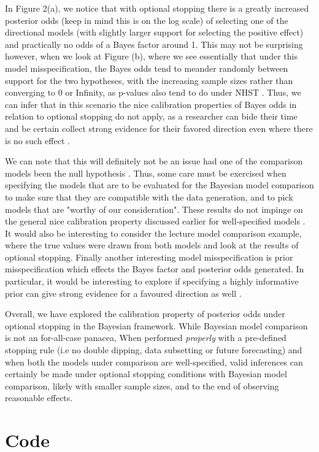 \documentclass{article}
\begin{document}
In Figure 2(a), we notice that with optional stopping there is a greatly increased posterior odds (keep in mind this is on the log scale) of selecting one of the directional models (with slightly larger support for selecting the positive effect) and practically no odds of a Bayes factor around 1. This may not be surprising however, when we look at Figure (b), where we see essentially that under this model misspecification, the Bayes odds tend to meander randomly between support for the two hypotheses, with the increasing sample sizes rather than converging to 0 or Infinity, as p-values also tend to do under NHST \cite{wage}. Thus, we can infer that in this scenario the nice calibration properties of Bayes odds in relation to optional stopping do not apply, as a researcher can bide their time and be certain collect strong evidence for their favored direction even where there is no such effect \cite{wage}. 

We can note that this will definitely not be an issue had one of the comparison models been the null hypothesis \cite{wage}. Thus, some care must be exercised when specifying the models that are to be evaluated for the Bayesian model comparison to make sure that they are compatible with the data generation, and to pick models that are "worthy of our consideration". These results do not impinge on the general nice calibration property discussed earlier for well-specified models \cite{rounder}. It would also be interesting to consider the lecture model comparison example, where the true values were drawn from both models and look at the results of optional stopping. Finally another interesting model misspecification is prior misspecification which effects the Bayes factor and posterior odds generated. In particular, it would be interesting to explore if specifying a highly informative prior can give strong evidence for a favoured direction as well \cite{heid}. 

Overall, we have explored the calibration property of posterior odds under optional stopping in the Bayesian framework. While Bayesian model comparison is not an for-all-case panacea,  When performed \textit{properly} with a pre-defined stopping rule (i.e no double dipping, data subsetting or future forecasting) and when both the models under comparison are well-specified, valid inferences can certainly be made under optional stopping conditions with Bayesian model comparison, likely with smaller sample sizes, and to the end of observing reasonable effects.  

\section{Code}
\end{document}
